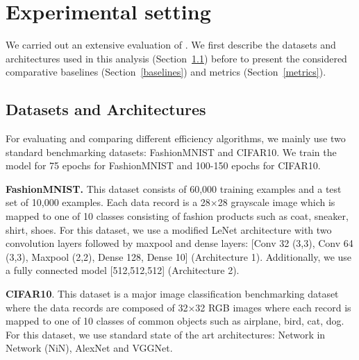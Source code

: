 \section{Experimental setting}
\label{setting}

We carried out an extensive evaluation of \method. %
%
We first describe the datasets and architectures used in this analysis (Section~\ref{datasets}) before to present the considered comparative baselines (Section~\ref{baselines}) and metrics (Section~\ref{metrics}). %


\subsection{Datasets and Architectures}
\label{datasets}

For evaluating and comparing different efficiency algorithms, we mainly use two standard benchmarking datasets: FashionMNIST and CIFAR10.
We train the model for 75 epochs for FashionMNIST and 100-150 epochs for CIFAR10.

\noindent\textbf{FashionMNIST.} This dataset consists of 60,000 training examples and a test set of 10,000 examples.
Each data record is a 28$\times$28 grayscale image which is mapped to one of 10 classes consisting of fashion products such as coat, sneaker, shirt, shoes.
For this dataset, we use a modified LeNet architecture with two convolution layers followed by maxpool and dense layers: [Conv 32 (3,3), Conv 64 (3,3), Maxpool (2,2), Dense 128, Dense 10] (Architecture 1). Additionally, we use a fully connected model [512,512,512] (Architecture 2).

\noindent\textbf{CIFAR10}. This dataset is a major image classification benchmarking dataset where the data records are composed of 32$\times$32 RGB images where each record is mapped to one of 10 classes of common objects such as airplane, bird, cat, dog.
For this dataset, we use standard state of the art architectures: Network in Network (NiN), AlexNet and VGGNet.


